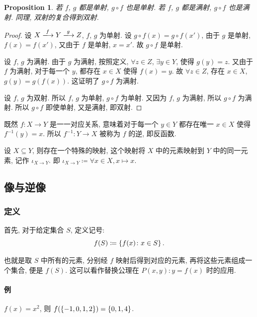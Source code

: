 \documentclass[UTF8]{ctexart}
\theoremstyle{mystyle}
\newtheorem{proposition}{Proposition}[section]
\theoremstyle{myremark}
\theoremstyle{plain}
\DeclarePairedDelimiter\set{\{}{\}}
\begin{document}
\begin{proposition} \label{c}
    若 $ f $, $ g $ 都是单射, $ g \circ f $ 也是单射. 若 $ f $, $ g $ 都是满射, $ g \circ f $ 也是满射. 同理, 双射的复合得到双射.
\end{proposition}

\begin{proof}
    设 $ X \xlongrightarrow{f} Y \xlongrightarrow{g} Z $, $ f $, $ g $ 为单射. 设 $ g \circ f (x) = g \circ f (x') $, 由于 $ g $ 是单射, $ f(x) = f(x') $, 又由于 $ f $ 是单射, $ x = x' $. 故 $ g \circ f $ 是单射.

    设 $ f $, $ g $ 为满射. 由于 $ g $ 为满射, 按照定义, $ \forall z \in Z $, $ \exists y \in Y $, 使得 $ g (y) = z $. 又由于 $ f $ 为满射, 对于每一个 $ y $, 都存在 $ x \in X $ 使得 $ f(x) = y $. 故 $ \forall z \in Z $, 存在 $ x \in X $, $ g(y) = g(f(x)) $. 这证明了 $ g \circ f $ 为满射.

    设 $ f $, $ g $ 为双射. 所以 $ f $, $ g $ 为单射, $ g \circ f $ 为单射. 又因为 $ f $, $ g $ 为满射, 所以 $ g \circ f $ 为满射. 所以 $ g \circ f $ 即使单射, 又是满射, 即双射.
\end{proof}

既然 $ f \colon X \to Y $ 是一一对应关系, 意味着对于每一个 $ y \in Y $ 都存在唯一 $ x \in X $ 使得 $ f^{-1}(y) = x $. 所以 $ f^{-1} \colon Y \to X $ 被称为 $ f $ 的逆, 即反函数.

\begin{definition}
    设 $ X \subseteq Y $, 则存在一个特殊的映射, 这个映射将 $ X $ 中的元素映射到 $ Y $ 中的同一元素, 记作 $ \iota_{X \to Y} $. 即 $ \iota_{X \to Y} \coloneqq \forall x \in X, x \mapsto x $.
\end{definition}



\subsection{像与逆像}
\subsubsection{定义}
首先, 对于给定集合 $ S $, 定义记号:
\[ f(S) \coloneqq \set{f(x) \colon x \in S}  \,.\]

也就是取 $ S $ 中所有的元素, 分别经 $ f $ 映射后得到对应的元素, 再将这些元素组成一个集合, 便是 $ f(S) $. 这可以看作替换公理在 $ P(x, y) \colon  y = f(x) $ 时的应用.

\paragraph{例}
$ f(x) = x^2 $, 则 $ f(\set{-1, 0, 1, 2}) = \set{0, 1, 4} $.
\end{document}
